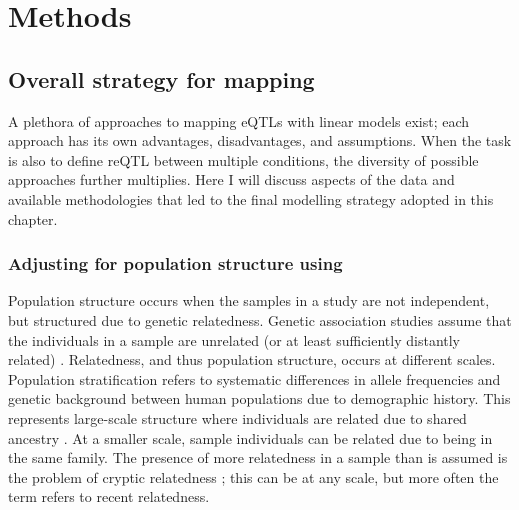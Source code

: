 \section{Methods}
\label{sec:hird_reQTL_methods}

\subsection{Overall strategy for  mapping}
\label{subsec:hird_reQTL_overall_strategy}

A plethora of approaches to mapping \glspl{eQTL} with linear models exist; each approach has its own advantages, disadvantages, and assumptions.
When the task is also to define \gls{reQTL} between multiple conditions, the diversity of possible approaches further multiplies.
Here I will discuss aspects of the data and available methodologies that led to the final modelling strategy adopted in this chapter.

\subsubsection{Adjusting for population structure using }

Population structure occurs when the samples in a study are not independent, but structured due to genetic relatedness.
Genetic association studies assume that the individuals in a sample are unrelated (or at least sufficiently distantly related) \autocite{astle2009PopulationStructureCryptic,sillanpaa2011OverviewTechniquesAccount,sul2018PopulationStructureGenetic}.
Relatedness, and thus population structure, occurs at different scales.
Population stratification refers to systematic differences in allele frequencies and genetic background between human populations due to demographic history.
This represents large-scale structure where individuals are related due to shared ancestry \autocite{price2010NewApproachesPopulation,sillanpaa2011OverviewTechniquesAccount}.
At a smaller scale, sample individuals can be related due to being in the same family.
The presence of more relatedness in a sample than is assumed is the problem of cryptic relatedness \autocite{astle2009PopulationStructureCryptic,sillanpaa2011OverviewTechniquesAccount,sul2018PopulationStructureGenetic};
this can be at any scale, but more often the term refers to recent relatedness.


